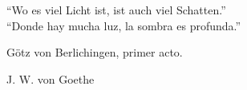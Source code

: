 \begin{dedication}
``Wo es viel Licht ist, ist auch viel Schatten.''\\
``Donde hay mucha luz, la sombra es profunda.''

Götz von Berlichingen, primer acto.

J. W. von Goethe
\end{dedication}
